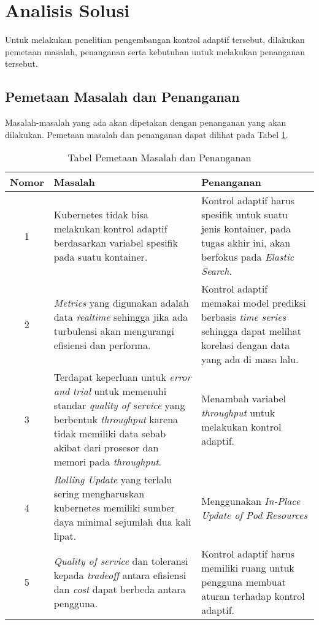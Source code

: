 \section{Analisis Solusi}

Untuk melakukan penelitian pengembangan kontrol adaptif tersebut, dilakukan pemetaan masalah, penanganan serta kebutuhan untuk melakukan penanganan tersebut.

\subsection{Pemetaan Masalah dan Penanganan}
\label{sec:pemetaan-masalah}
Masalah-masalah yang ada akan dipetakan dengan penanganan yang akan dilakukan. Pemetaan masalah dan penanganan dapat dilihat pada Tabel \ref{tab:pemetaan-masalah}.

\begin{table}[h]
    \caption{Tabel Pemetaan Masalah dan Penanganan}
    \vspace{0.25cm}
    \begin{center}
        \begin{tabular}{|c|p{2.5in}|p{2.5in}|}
            \hline
            Nomor & Masalah & Penanganan \tabularnewline
            \hline
            1 &
            Kubernetes tidak bisa melakukan kontrol adaptif berdasarkan variabel spesifik pada suatu kontainer. &
            Kontrol adaptif harus spesifik untuk suatu jenis kontainer, pada tugas akhir ini, akan berfokus pada \textit{Elastic Search}. \tabularnewline
            2 &
            \textit{Metrics} yang digunakan adalah data \textit{realtime} sehingga jika ada turbulensi akan mengurangi efisiensi dan performa. &
            Kontrol adaptif memakai model prediksi berbasis \textit{time series} sehingga dapat melihat korelasi dengan data yang ada di masa lalu.\tabularnewline
            3 & Terdapat keperluan untuk \textit{error and trial} untuk memenuhi standar \textit{quality of service} yang berbentuk \textit{throughput} karena tidak memiliki data sebab akibat dari prosesor dan memori pada \textit{throughput}. &
            Menambah variabel \textit{throughput} untuk melakukan kontrol adaptif.
            \tabularnewline
            4 & \textit{Rolling Update} yang terlalu sering mengharuskan kubernetes memiliki sumber daya minimal sejumlah dua kali lipat. &
            Menggunakan \textit{In-Place Update of Pod Resources} \tabularnewline
            5 & \textit{Quality of service} dan toleransi kepada \textit{tradeoff} antara efisiensi dan \textit{cost} dapat berbeda antara pengguna. &
            Kontrol adaptif harus memiliki ruang untuk pengguna membuat aturan terhadap kontrol adaptif.\tabularnewline
            \hline
        \end{tabular}
    \end{center}
    \label{tab:pemetaan-masalah}
\end{table}

